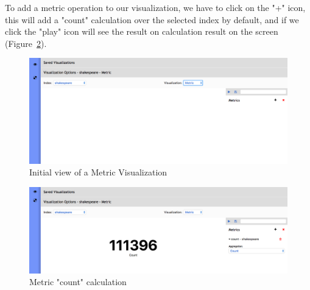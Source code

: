 \documentclass[a4paper, 12pt, english]{book}
\begin{document}
To add a metric operation to our visualization, we have to click on the "+" icon, this will add a "count" calculation over the selected index by default, and if we click the "play" icon will see the result on calculation result on the screen (Figure~\ref{fig:metric-count-calcuation}).

\begin{figure}
  \centering
  \includegraphics[width=13cm, keepaspectratio]{img/metric-visualization-initial-view.png}
  \caption{Initial view of a Metric Visualization}
  \label{fig:metric-visualization-initial-view}
\end{figure}

\begin{figure}
  \centering
  \includegraphics[width=13cm, keepaspectratio]{img/metric-count-calcuation.png}
  \caption{Metric "count" calculation}
  \label{fig:metric-count-calcuation}
\end{figure}
\end{document}
